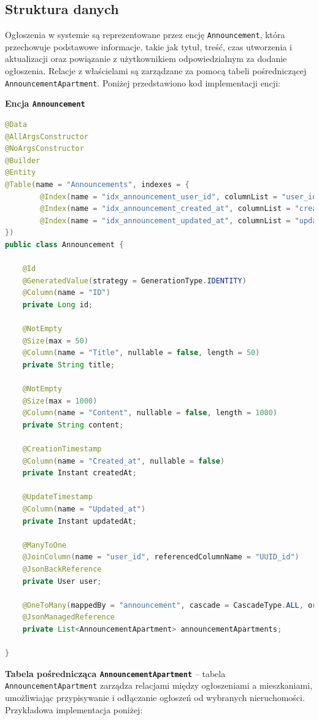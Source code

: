 \subsection{Struktura danych}

Ogłoszenia w systemie są reprezentowane przez encję \texttt{Announcement}, która przechowuje podstawowe informacje, takie jak tytuł, treść, czas utworzenia i aktualizacji oraz powiązanie z użytkownikiem odpowiedzialnym za dodanie ogłoszenia. Relacje z właścielami są zarządzane za pomocą tabeli pośredniczącej \texttt{AnnouncementApartment}. Poniżej przedstawiono kod implementacji encji:

\textbf{Encja \texttt{Announcement}}
\begin{lstlisting}[language=Java, style=JavaStyle, caption=Encja \texttt{Announcement}]
@Data
@AllArgsConstructor
@NoArgsConstructor
@Builder
@Entity
@Table(name = "Announcements", indexes = {
        @Index(name = "idx_announcement_user_id", columnList = "user_id"),
        @Index(name = "idx_announcement_created_at", columnList = "created_at"),
        @Index(name = "idx_announcement_updated_at", columnList = "updated_at")
})
public class Announcement {

    @Id
    @GeneratedValue(strategy = GenerationType.IDENTITY)
    @Column(name = "ID")
    private Long id;

    @NotEmpty
    @Size(max = 50)
    @Column(name = "Title", nullable = false, length = 50)
    private String title;

    @NotEmpty
    @Size(max = 1000)
    @Column(name = "Content", nullable = false, length = 1000)
    private String content;

    @CreationTimestamp
    @Column(name = "Created_at", nullable = false)
    private Instant createdAt;

    @UpdateTimestamp
    @Column(name = "Updated_at")
    private Instant updatedAt;

    @ManyToOne
    @JoinColumn(name = "user_id", referencedColumnName = "UUID_id")
    @JsonBackReference
    private User user;

    @OneToMany(mappedBy = "announcement", cascade = CascadeType.ALL, orphanRemoval = true, fetch = FetchType.LAZY)
    @JsonManagedReference
    private List<AnnouncementApartment> announcementApartments;

}
\end{lstlisting}

\textbf{Tabela pośrednicząca \texttt{AnnouncementApartment}} -- tabela \texttt{AnnouncementApartment} zarządza relacjami między ogłoszeniami a mieszkaniami, umożliwiając przypisywanie i odłączanie ogłoszeń od wybranych nieruchomości. Przykładowa implementacja poniżej:

